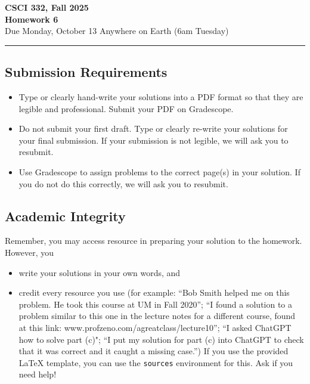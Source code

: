 \documentclass[11pt]{article}
\begin{document}
\begin{center}
\Large\textbf{CSCI 332, Fall 2025}%
\\
\LARGE\textbf{Homework 6}%
\\[0.5ex]
\large Due Monday, October 13 Anywhere on Earth (6am Tuesday)
\end{center}

\bigskip
\hrule
\bigskip

\subsection*{Submission Requirements}
\begin{itemize}
    \item Type or clearly hand-write your solutions into a PDF format so that they are legible and professional. Submit your PDF on Gradescope. 
    \item Do not submit your first draft. Type or clearly re-write your solutions for your final submission. If your submission is not legible, we will ask you to resubmit.
    \item Use Gradescope to assign problems to the correct page(s) in your solution. If you do not do this correctly, we will ask you to resubmit.
\end{itemize}

\subsection*{Academic Integrity}

Remember, you may access  resource in preparing your solution to the homework. However, you 
\begin{itemize}
    \item write your solutions in your own words, and
    \item credit every resource you use (for example: ``Bob Smith helped me on
    this problem. He took this course at UM in Fall 2020''; ``I found a solution
    to a problem similar to this one in the lecture notes for a different
    course, found at this link: www.profzeno.com/agreatclass/lecture10''; ``I
    asked ChatGPT how to solve  part (c)"; ``I put my solution for part (c) into
    ChatGPT to check that it was correct and it caught a missing case.'') If you
    use the provided LaTeX template, you can use the \texttt{sources}
    environment for this. Ask if you need help!
\end{itemize}
\end{document}
